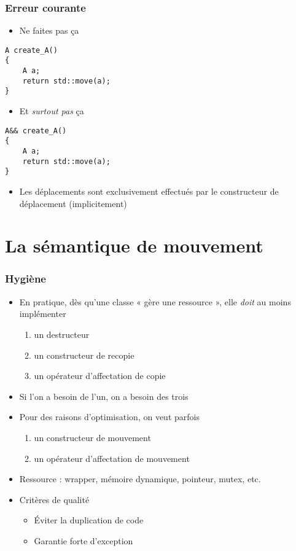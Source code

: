 \begin{frame}[containsverbatim]
\frametitle{Erreur courante}
\begin{itemize}
\item Ne faites pas ça
\end{itemize}
\begin{lstlisting}
A create_A()
{
	A a;
	return std::move(a);
}
\end{lstlisting}
\begin{itemize}
\item Et \emph{surtout pas} ça
\end{itemize}
\begin{lstlisting}
A&& create_A()
{
	A a;
	return std::move(a);
}
\end{lstlisting}
\begin{itemize}
\item Les déplacements sont exclusivement effectués par le constructeur de déplacement (implicitement)
\end{itemize}
\end{frame}

\section{La sémantique de mouvement}

\begin{frame}
\frametitle{Hygiène}
\begin{itemize}[<+->]
\item En pratique, dès qu'une classe « gère une ressource », elle \emph{doit} au moins implémenter 
	\begin{enumerate}
	\item un destructeur
	\item un constructeur de recopie
	\item un opérateur d'affectation de copie
	\end{enumerate}
\item Si l'on a besoin de l'un, on a besoin des trois
\item Pour des raisons d'optimisation, on veut parfois
	\begin{enumerate}
	\item un constructeur de mouvement
	\item un opérateur d'affectation de mouvement
	\end{enumerate}
\item Ressource : wrapper, mémoire dynamique, pointeur, mutex, etc.
\item Critères de qualité
	\begin{itemize}
	\item Éviter la duplication de code
	\item Garantie forte d'exception
	\end{itemize}
\end{itemize}
\end{frame}

